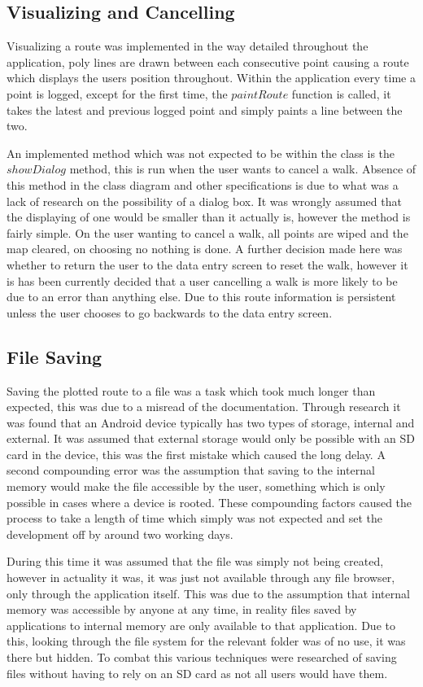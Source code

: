 \subsection{Visualizing and Cancelling}
Visualizing a route was implemented in the way detailed throughout the application, poly lines are drawn between each consecutive point causing a route which displays the users position throughout. Within the application every time a point is logged, except for the first time, the $paintRoute$ function is called, it takes the latest and previous logged point and simply paints a line between the two.

An implemented method which was not expected to be within the class is the $showDialog$ method, this is run when the user wants to cancel a walk. Absence of this method in the class diagram and other specifications is due to what was a lack of research on the possibility of a dialog box. It was wrongly assumed that the displaying of one would be smaller than it actually is, however the method is fairly simple. On the user wanting to cancel a walk, all points are wiped and the map cleared, on choosing no nothing is done. A further decision made here was whether to return the user to the data entry screen to reset the walk, however it is has been currently decided that a user cancelling a walk is more likely to be due to an error than anything else. Due to this route information is persistent unless the user chooses to go backwards to the data entry screen. 

\subsection{File Saving}
Saving the plotted route to a file was a task which took much longer than expected, this was due to a misread of the documentation. Through research it was found that an Android device typically has two types of storage, internal and external. It was assumed that external storage would only be possible with an SD card in the device, this was the first mistake which caused the long delay. A second compounding error was the assumption that saving to the internal memory would make the file accessible by the user\cite{storage}, something which is only possible in cases where a device is rooted. These compounding factors caused the process to take a length of time which simply was not expected and set the development off by around two working days. 

During this time it was assumed that the file was simply not being created, however in actuality it was, it was just not available through any file browser, only through the application itself. This was due to the assumption that internal memory was accessible by anyone at any time, in reality files saved by applications to internal memory are only available to that application. Due to this, looking through the file system for the relevant folder was of no use, it was there but hidden. To combat this various techniques were researched of saving files without having to rely on an SD card as not all users would have them. 

